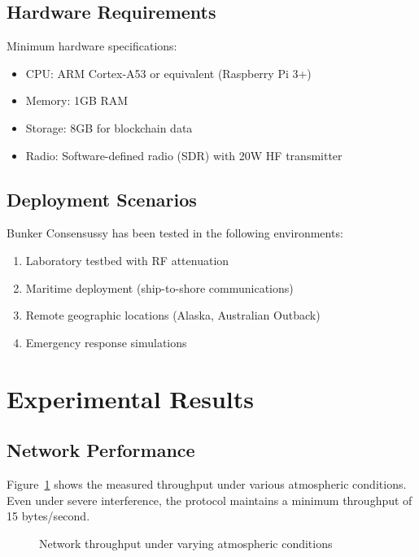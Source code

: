 \documentclass[11pt,a4paper]{article}
\begin{document}
\subsection{Hardware Requirements}

Minimum hardware specifications:
\begin{itemize}
\item CPU: ARM Cortex-A53 or equivalent (Raspberry Pi 3+)
\item Memory: 1GB RAM
\item Storage: 8GB for blockchain data
\item Radio: Software-defined radio (SDR) with 20W HF transmitter
\end{itemize}

\subsection{Deployment Scenarios}

Bunker Consensussy has been tested in the following environments:
\begin{enumerate}
\item Laboratory testbed with RF attenuation
\item Maritime deployment (ship-to-shore communications)
\item Remote geographic locations (Alaska, Australian Outback)
\item Emergency response simulations
\end{enumerate}

\section{Experimental Results}

\subsection{Network Performance}

Figure~\ref{fig:throughput} shows the measured throughput under various atmospheric conditions. Even under severe interference, the protocol maintains a minimum throughput of 15 bytes/second.

\begin{figure}[h]
\centering
{}
\caption{Network throughput under varying atmospheric conditions}
\label{fig:throughput}
\end{figure}
\end{document}
